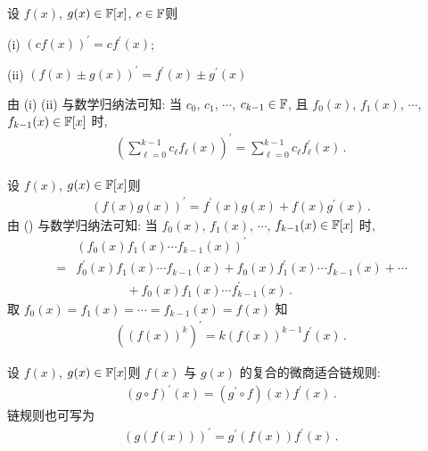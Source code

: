 \begin{proposition}
    设 $f(x)$, $g(x) \in \mathbb{F}[x]$, $c \in \mathbb{F}$\period 则

    (i) $(cf(x))^{\prime} = c f^{\prime} (x)$;

    (ii) $(f(x) \pm g(x))^{\prime} = f^{\prime} (x) \pm g^{\prime} (x)$\period

    由 (i) (ii) 与数学归纳法可知: 当 $c_0$, $c_1$, $\cdots$, $c_{k-1} \in \mathbb{F}$, 且 $f_0 (x)$, $f_1 (x)$, $\cdots$, $f_{k-1} (x) \in \mathbb{F}[x]$ 时,
    \begin{align*}
        \left( \sum_{\ell = 0}^{k-1} c_\ell f_\ell (x) \right)^{\prime} = \sum_{\ell = 0}^{k-1} c_\ell f_\ell^{\prime} (x) \period
    \end{align*}
\end{proposition}

\begin{proposition}
    设 $f(x)$, $g(x) \in \mathbb{F}[x]$\period 则
    \begin{align*}
        (f(x) g(x))^{\prime} = f^{\prime} (x) g(x) + f(x) g^{\prime} (x) \period \tag*{(\myStar)}
    \end{align*}
    由 (\myStar) 与数学归纳法可知: 当 $f_0 (x)$, $f_1 (x)$, $\cdots$, $f_{k-1} (x) \in \mathbb{F}[x]$ 时,
    \begin{align*}
             & (f_0 (x) f_1 (x) \cdots f_{k-1} (x))^{\prime}                                                      \\
        = {} & f_0^{\prime} (x) f_1 (x) \cdots f_{k-1} (x) + f_0 (x) f_1^{\prime} (x) \cdots f_{k-1} (x) + \cdots \\
             & \qquad \qquad + f_0 (x) f_1 (x) \cdots f_{k-1}^{\prime} (x) \period
    \end{align*}
    取 $f_0 (x) = f_1 (x) = \cdots = f_{k-1} (x) = f(x)$ 知
    \begin{align*}
        ((f(x))^k)^{\prime} = k(f(x))^{k-1} f^{\prime} (x) \period
    \end{align*}
\end{proposition}

\begin{proposition}
    设 $f(x)$, $g(x) \in \mathbb{F}[x]$\period 则 $f(x)$ 与 $g(x)$ 的复合的微商适合链规则:
    \begin{align*}
        (g \circ f)^{\prime} (x) = (g^{\prime} \circ f)(x) f^{\prime} (x) \period
    \end{align*}
    链规则也可写为
    \begin{align*}
        (g(f(x)))^{\prime} = g^{\prime} (f(x)) f^{\prime} (x) \period
    \end{align*}
\end{proposition}

